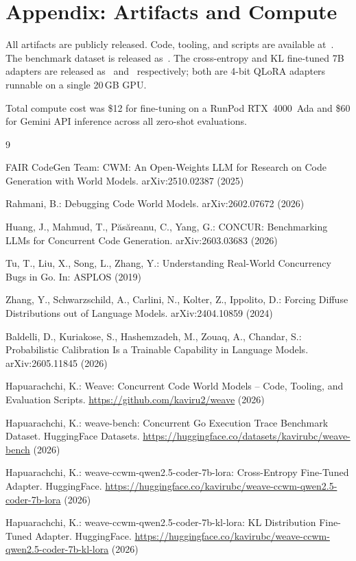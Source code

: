 \documentclass{svproc}
\begin{document}
\section*{Appendix: Artifacts and Compute}

All artifacts are publicly released. Code, tooling, and scripts are
available at~\cite{weave-repo}. The benchmark dataset is
released as~\cite{weave-bench}. The cross-entropy and KL fine-tuned
7B adapters are released as~\cite{weave-ce} and~\cite{weave-kl}
respectively; both are 4-bit QLoRA adapters runnable on a single
20\,GB GPU.

Total compute cost was \$12 for fine-tuning on a RunPod RTX~4000~Ada
and \$60 for Gemini API inference across all zero-shot evaluations.

\begin{thebibliography}{9}

FAIR CodeGen Team:
CWM: An Open-Weights LLM for Research on Code Generation with World Models.
arXiv:2510.02387 (2025)

Rahmani, B.:
Debugging Code World Models.
arXiv:2602.07672 (2026)

Huang, J., Mahmud, T., P\u{a}s\u{a}reanu, C., Yang, G.:
CONCUR: Benchmarking LLMs for Concurrent Code Generation.
arXiv:2603.03683 (2026)

Tu, T., Liu, X., Song, L., Zhang, Y.:
Understanding Real-World Concurrency Bugs in Go.
In: ASPLOS (2019)

Zhang, Y., Schwarzschild, A., Carlini, N., Kolter, Z., Ippolito, D.:
Forcing Diffuse Distributions out of Language Models.
arXiv:2404.10859 (2024)

Baldelli, D., Kuriakose, S., Hashemzadeh, M., Zouaq, A., Chandar, S.:
Probabilistic Calibration Is a Trainable Capability in Language Models.
arXiv:2605.11845 (2026)

Hapuarachchi, K.:
Weave: Concurrent Code World Models -- Code, Tooling, and Evaluation Scripts.
\url{https://github.com/kaviru2/weave} (2026)

Hapuarachchi, K.:
weave-bench: Concurrent Go Execution Trace Benchmark Dataset.
HuggingFace Datasets.
\url{https://huggingface.co/datasets/kavirubc/weave-bench} (2026)

Hapuarachchi, K.:
weave-ccwm-qwen2.5-coder-7b-lora: Cross-Entropy Fine-Tuned Adapter.
HuggingFace.
\url{https://huggingface.co/kavirubc/weave-ccwm-qwen2.5-coder-7b-lora} (2026)

Hapuarachchi, K.:
weave-ccwm-qwen2.5-coder-7b-kl-lora: KL Distribution Fine-Tuned Adapter.
HuggingFace.
\url{https://huggingface.co/kavirubc/weave-ccwm-qwen2.5-coder-7b-kl-lora} (2026)

\end{thebibliography}
\end{document}
